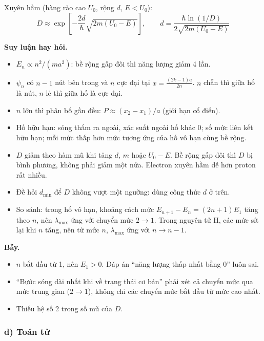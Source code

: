 \documentclass[11pt,a4paper]{article}
\begin{document}
Xuyên hầm (hàng rào cao $U_0$, rộng $d$, $E<U_0$):
\begin{equation*}
    D\approx\exp\!\left[-\frac{2d}{\hbar}\sqrt{2m(U_0-E)}\right],\qquad d=\frac{\hbar\ln(1/D)}{2\sqrt{2m(U_0-E)}}
\end{equation*}

\textbf{Suy luận hay hỏi.}
\begin{itemize}
    \item $E_n\propto n^2/(ma^2)$: bề rộng gấp đôi thì năng lượng giảm 4 lần.
    \item $\psi_n$ có $n-1$ nút bên trong và $n$ cực đại tại $x=\frac{(2k-1)a}{2n}$. $n$ chẵn thì giữa hố là nút, $n$ lẻ thì giữa hố là cực đại.
    \item $n$ lớn thì phân bố gần đều: $P\approx(x_2-x_1)/a$ (giới hạn cổ điển).
    \item Hố hữu hạn: sóng thấm ra ngoài, xác suất ngoài hố khác 0; số mức liên kết hữu hạn; mỗi mức thấp hơn mức tương ứng của hố vô hạn cùng bề rộng.
    \item $D$ giảm theo hàm mũ khi tăng $d$, $m$ hoặc $U_0-E$. Bề rộng gấp đôi thì $D$ bị bình phương, không phải giảm một nửa. Electron xuyên hầm dễ hơn proton rất nhiều.
    \item Đề hỏi $d_{\min}$ để $D$ không vượt một ngưỡng: dùng công thức $d$ ở trên.
    \item So sánh: trong hố vô hạn, khoảng cách mức $E_{n+1}-E_n=(2n+1)E_1$ tăng theo $n$, nên $\lambda_{\max}$ ứng với chuyển mức $2\to1$. Trong nguyên tử H, các mức sít lại khi $n$ tăng, nên từ mức $n$, $\lambda_{\max}$ ứng với $n\to n-1$.
\end{itemize}

\textbf{Bẫy.}
\begin{itemize}
    \item $n$ bắt đầu từ 1, nên $E_1>0$. Đáp án ``năng lượng thấp nhất bằng 0'' luôn sai.
    \item ``Bước sóng dài nhất khi về trạng thái cơ bản'' phải xét cả chuyển mức qua mức trung gian ($2\to1$), không chỉ các chuyển mức bắt đầu từ mức cao nhất.
    \item Thiếu hệ số 2 trong số mũ của $D$.
\end{itemize}

\subsubsection*{d) Toán tử}
\end{document}

